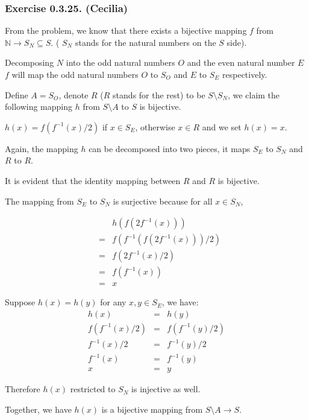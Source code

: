 \subsubsection*{Exercise 0.3.25. (Cecilia)}

From the problem, we know that there exists a bijective mapping $ f $ from $ \mathbb{N} \to S_N \subseteq S $. ( $ S_N $ stands for the natural numbers on the $ S $ side).

Decomposing $ N $ into the odd natural numbers $ O $ and the even natural number $ E $ $ f $ will map the odd natural numbers $ O $ to $ S_O $ and $ E $ to $ S_E $ respectively. 

Define $ A = S_O $, denote $ R $ ($ R $ stands for the rest) to be $ S \setminus S_N $, we claim the following mapping $ h $ from $ S \setminus A $ to $ S $ is bijective.

$ h(x) = f(f^{-1}(x)/2) $ if $ x \in S_E $, otherwise $ x \in R $ and we set $ h(x) = x $.

Again, the mapping $ h $ can be decomposed into two pieces, it maps $ S_E $ to $ S_N $ and $ R $ to $ R $.

It is evident that the identity mapping between $ R $ and $ R $ is bijective.

The mapping from $ S_E $ to $ S_N $ is surjective because for all $ x \in S_N $, 

\begin{eqnarray*}
  & & h(f(2f^{-1}(x))) \\
  &=& f(f^{-1}(f(2f^{-1}(x)))/2) \\
  &=& f(2f^{-1}(x)/2) \\
  &=& f(f^{-1}(x)) \\
  &=& x
\end{eqnarray*}

Suppose $ h(x) = h(y) $ for any $ x, y \in S_E $, we have:
\begin{eqnarray*}
              h(x) &=& h(y) \\
    f(f^{-1}(x)/2) &=& f(f^{-1}(y)/2) \\
       f^{-1}(x)/2 &=& f^{-1}(y)/2 \\
         f^{-1}(x) &=& f^{-1}(y) \\
                x &=& y 
  \end{eqnarray*}

  Therefore $ h(x) $ restricted to $ S_N $ is injective as well.

  Together, we have $ h(x) $ is a bijective mapping from $ S \setminus A \to S $.
